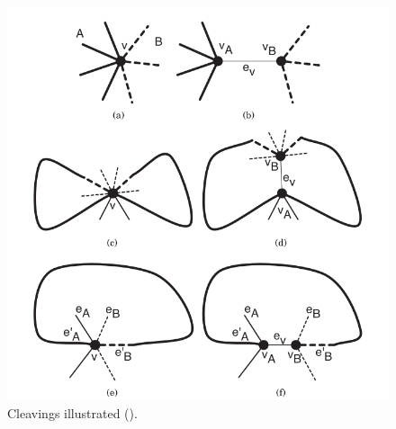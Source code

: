 \begin{figure}[h]
    \centering
    \includegraphics[scale=0.5]{imgs/cleaving.png}
    \caption{Cleavings illustrated (\cite{borradaile_2EC}).}
    \label{fig:cleaving}
\end{figure}

